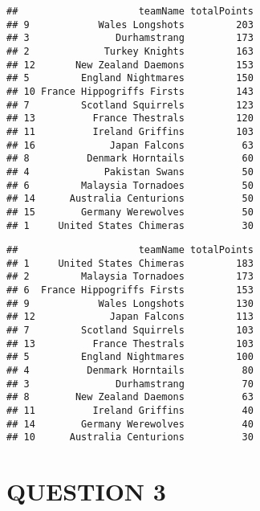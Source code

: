 \documentclass[
]{article}
\newenvironment{Shaded}{\begin{snugshade}}{\end{snugshade}}
\newcommand{\AttributeTok}[1]{\textcolor[rgb]{0.77,0.63,0.00}{#1}}
\newcommand{\CommentTok}[1]{\textcolor[rgb]{0.56,0.35,0.01}{\textit{#1}}}
\newcommand{\DecValTok}[1]{\textcolor[rgb]{0.00,0.00,0.81}{#1}}
\newcommand{\FunctionTok}[1]{\textcolor[rgb]{0.00,0.00,0.00}{#1}}
\newcommand{\NormalTok}[1]{#1}
\newcommand{\OtherTok}[1]{\textcolor[rgb]{0.56,0.35,0.01}{#1}}
\newcommand{\SpecialCharTok}[1]{\textcolor[rgb]{0.00,0.00,0.00}{#1}}
\begin{document}
\begin{verbatim}
##                     teamName totalPoints
## 9            Wales Longshots         203
## 3               Durhamstrang         173
## 2             Turkey Knights         163
## 12       New Zealand Daemons         153
## 5         England Nightmares         150
## 10 France Hippogriffs Firsts         143
## 7         Scotland Squirrels         123
## 13          France Thestrals         120
## 11          Ireland Griffins         103
## 16             Japan Falcons          63
## 8          Denmark Horntails          60
## 4             Pakistan Swans          50
## 6         Malaysia Tornadoes          50
## 14      Australia Centurions          50
## 15        Germany Werewolves          50
## 1     United States Chimeras          30
\end{verbatim}

\begin{Shaded}
\end{Shaded}

\begin{verbatim}
##                     teamName totalPoints
## 1     United States Chimeras         183
## 2         Malaysia Tornadoes         173
## 6  France Hippogriffs Firsts         153
## 9            Wales Longshots         130
## 12             Japan Falcons         113
## 7         Scotland Squirrels         103
## 13          France Thestrals         103
## 5         England Nightmares         100
## 4          Denmark Horntails          80
## 3               Durhamstrang          70
## 8        New Zealand Daemons          63
## 11          Ireland Griffins          40
## 14        Germany Werewolves          40
## 10      Australia Centurions          30
\end{verbatim}

\hypertarget{question-3}{%
\section{QUESTION 3}\label{question-3}}
\end{document}
